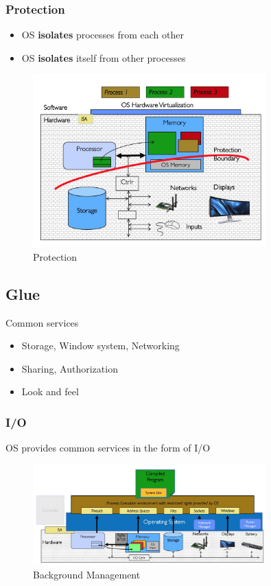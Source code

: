 \subsubsection{Protection}
\begin{itemize}
    \item OS \textbf{isolates} processes from each other
    \item OS \textbf{isolates} itself from other processes
\end{itemize}
\begin{figure}[H]
    \centering
    \includegraphics[width = 0.8\textwidth ]{figures/protection.jpg}
    \caption{Protection}
\end{figure}

\subsection{Glue}
Common services
\begin{itemize}
    \item Storage, Window system, Networking
    \item Sharing, Authorization
    \item Look and feel
\end{itemize}
\subsubsection{I/O}
OS provides common services in the form of I/O

\begin{figure}[H]
    \centering
    \includegraphics[width = 0.8\textwidth ]{figures/background_management.jpg}
    \caption{Background Management}
\end{figure}

